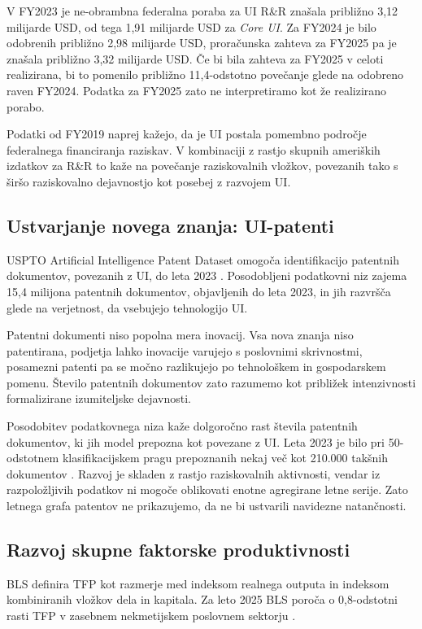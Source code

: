 \documentclass[12pt,a4paper]{article}
\begin{document}
V FY2023 je ne-obrambna federalna poraba za UI R\&R znašala približno 3,12 milijarde USD, od tega 1,91 milijarde USD za \emph{Core UI}. Za FY2024 je bilo odobrenih približno 2,98 milijarde USD, proračunska zahteva za FY2025 pa je znašala približno 3,32 milijarde USD. Če bi bila zahteva za FY2025 v celoti realizirana, bi to pomenilo približno 11,4-odstotno povečanje glede na odobreno raven FY2024. Podatka za FY2025 zato ne interpretiramo kot že realizirano porabo.

Podatki od FY2019 naprej kažejo, da je UI postala pomembno področje federalnega financiranja raziskav. V kombinaciji z rastjo skupnih ameriških izdatkov za R\&R to kaže na povečanje raziskovalnih vložkov, povezanih tako s širšo raziskovalno dejavnostjo kot posebej z razvojem UI.

\subsection{Ustvarjanje novega znanja: UI-patenti}

USPTO Artificial Intelligence Patent Dataset omogoča identifikacijo patentnih dokumentov, povezanih z UI, do leta 2023 \parencite{uspto2025aipd}. Posodobljeni podatkovni niz zajema 15,4 milijona patentnih dokumentov, objavljenih do leta 2023, in jih razvršča glede na verjetnost, da vsebujejo tehnologijo UI.

Patentni dokumenti niso popolna mera inovacij. Vsa nova znanja niso patentirana, podjetja lahko inovacije varujejo s poslovnimi skrivnostmi, posamezni patenti pa se močno razlikujejo po tehnološkem in gospodarskem pomenu. Število patentnih dokumentov zato razumemo kot približek intenzivnosti formalizirane izumiteljske dejavnosti.

Posodobitev podatkovnega niza kaže dolgoročno rast števila patentnih dokumentov, ki jih model prepozna kot povezane z UI. Leta 2023 je bilo pri 50-odstotnem klasifikacijskem pragu prepoznanih nekaj več kot 210.000 takšnih dokumentov \parencite{uspto2025aipd}. Razvoj je skladen z rastjo raziskovalnih aktivnosti, vendar iz razpoložljivih podatkov ni mogoče oblikovati enotne agregirane letne serije. Zato letnega grafa patentov ne prikazujemo, da ne bi ustvarili navidezne natančnosti.

\subsection{Razvoj skupne faktorske produktivnosti}

BLS definira TFP kot razmerje med indeksom realnega outputa in indeksom kombiniranih vložkov dela in kapitala. Za leto 2025 BLS poroča o 0,8-odstotni rasti TFP v zasebnem nekmetijskem poslovnem sektorju \parencite{bls2026tfp}.
\end{document}
